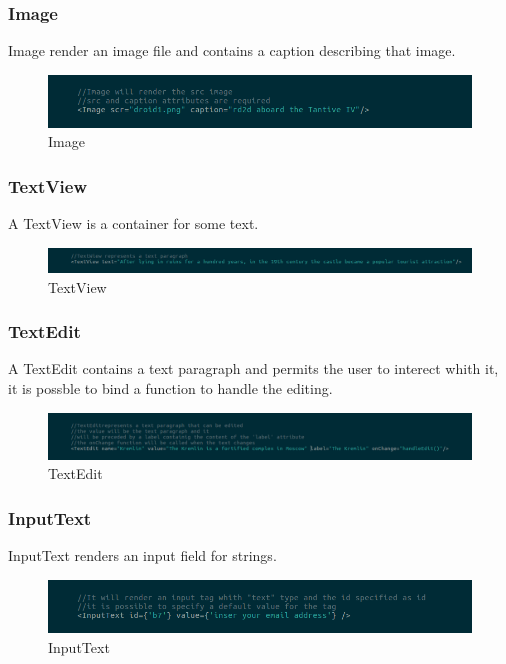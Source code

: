 \subsubsection{Image}
Image render an image file and contains a caption describing that image.
\begin{figure}[H]
	\centering
	\includegraphics[width=14cm]{../../documenti/UserManualFramework/framework_view/13framework_view_image.png}
	\caption{Image}
\end{figure}

\subsubsection{TextView}
A TextView is a container for some text.
\begin{figure}[H]
	\centering
	\includegraphics[width=14cm]{../../documenti/UserManualFramework/framework_view/14framework_view_textview.png}
	\caption{TextView}
\end{figure}

\subsubsection{TextEdit}
A TextEdit contains a text paragraph and permits the user to interect whith it, it is possble to bind a function to handle the editing.
\begin{figure}[H]
	\centering
	\includegraphics[width=14cm]{../../documenti/UserManualFramework/framework_view/15framework_view_textedit.png}
	\caption{TextEdit}
\end{figure}

\subsubsection{InputText}
InputText renders an input field for strings.
\begin{figure}[H]
	\centering
	\includegraphics[width=14cm]{../../documenti/UserManualFramework/framework_view/16framework_view_inputtext.png}
	\caption{InputText}
\end{figure}

